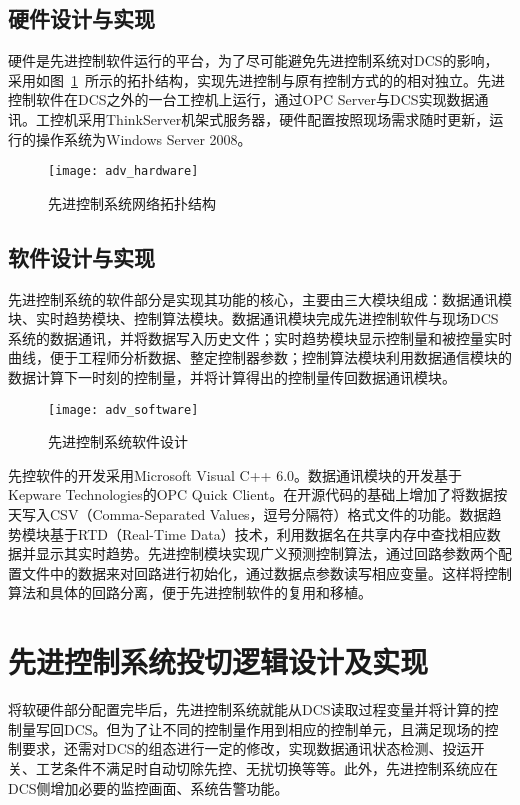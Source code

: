 \subsection{硬件设计与实现}
硬件是先进控制软件运行的平台，为了尽可能避免先进控制系统对DCS的影响，采用如图~\ref{fig:adv_hardware}~所示的拓扑结构，实现先进控制与原有控制方式的的相对独立。先进控制软件在DCS之外的一台工控机上运行，通过OPC Server与DCS实现数据通讯。工控机采用ThinkServer机架式服务器，硬件配置按照现场需求随时更新，运行的操作系统为Windows Server 2008。
\begin{figure}[!hbt]
\centering
\texttt{[image: adv\_hardware]}
\caption{先进控制系统网络拓扑结构} \label{fig:adv_hardware}
\end{figure}
 
\subsection{软件设计与实现}
先进控制系统的软件部分是实现其功能的核心，主要由三大模块组成：数据通讯模块、实时趋势模块、控制算法模块。数据通讯模块完成先进控制软件与现场DCS系统的数据通讯，并将数据写入历史文件；实时趋势模块显示控制量和被控量实时曲线，便于工程师分析数据、整定控制器参数；控制算法模块利用数据通信模块的数据计算下一时刻的控制量，并将计算得出的控制量传回数据通讯模块。
\begin{figure}[!hbt]
\centering
\texttt{[image: adv\_software]}
\caption{先进控制系统软件设计} \label{fig:adv_software}
\end{figure}

先控软件的开发采用Microsoft Visual C++ 6.0。数据通讯模块的开发基于Kepware Technologies的OPC Quick Client。在开源代码的基础上增加了将数据按天写入CSV（Comma-Separated Values，逗号分隔符）格式文件的功能。数据趋势模块基于RTD（Real-Time Data）技术，利用数据名在共享内存中查找相应数据并显示其实时趋势。先进控制模块实现广义预测控制算法，通过回路参数两个配置文件中的数据来对回路进行初始化，通过数据点参数读写相应变量。这样将控制算法和具体的回路分离，便于先进控制软件的复用和移植。

\section{先进控制系统投切逻辑设计及实现}
将软硬件部分配置完毕后，先进控制系统就能从DCS读取过程变量并将计算的控制量写回DCS。但为了让不同的控制量作用到相应的控制单元，且满足现场的控制要求，还需对DCS的组态进行一定的修改，实现数据通讯状态检测、投运开关、工艺条件不满足时自动切除先控、无扰切换等等。此外，先进控制系统应在DCS侧增加必要的监控画面、系统告警功能。


